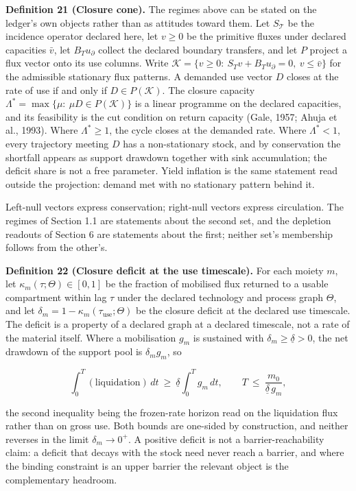 \documentclass[11pt]{article}
\begin{document}
\textbf{Definition 21 (Closure cone).} The regimes above can be stated on the ledger's own objects rather than as attitudes toward them. Let \(S_{\mathcal{T}}\) be the incidence operator declared here, let \(v\ge0\) be the primitive fluxes under declared capacities \(\bar v\), let \(B_Tu_\partial\) collect the declared boundary transfers, and let \(P\) project a flux vector onto its use columns. Write \(\mathcal K=\allowbreak{}\{v\ge0:\ S_Tv+\allowbreak{}B_Tu_\partial=\allowbreak{}0,\allowbreak{}\ v\le\bar v\}\) for the admissible stationary flux patterns. A demanded use vector \(D\) closes at the rate of use if and only if \(D\in P(\mathcal K)\). The closure capacity \(\Lambda^{*}=\allowbreak{}\max\{\mu:\ \mu D\in P(\mathcal K)\}\) is a linear programme on the declared capacities, and its feasibility is the cut condition on return capacity (Gale, 1957; Ahuja et al., 1993). Where \(\Lambda^{*}\ge1\), the cycle closes at the demanded rate. Where \(\Lambda^{*}<1\), every trajectory meeting \(D\) has a non-stationary stock, and by conservation the shortfall appears as support drawdown together with sink accumulation; the deficit share is not a free parameter. Yield inflation is the same statement read outside the projection: demand met with no stationary pattern behind it.

Left-null vectors express conservation; right-null vectors express circulation. The regimes of Section 1.1 are statements about the second set, and the depletion readouts of Section 6 are statements about the first; neither set's membership follows from the other's.

\textbf{Definition 22 (Closure deficit at the use timescale).} For each moiety \(m\), let \(\kappa_m(\tau;\Theta)\in[0,1]\) be the fraction of mobilised flux returned to a usable compartment within lag \(\tau\) under the declared technology and process graph \(\Theta\), and let \(\delta_m=\allowbreak{}1-\kappa_m(\tau_{\mathrm{use}};\Theta)\) be the closure deficit at the declared use timescale. The deficit is a property of a declared graph at a declared timescale, not a rate of the material itself. Where a mobilisation \(g_m\) is sustained with \(\delta_m\ge\underline\delta>0\), the net drawdown of the support pool is \(\delta_mg_m\), so 

$$\int_0^T(\text{liquidation})\,dt\ \ge\ \underline\delta\int_0^Tg_m\,dt, \qquad T\ \le\ \frac{m_0}{\underline\delta\,g_m},$$

 the second inequality being the frozen-rate horizon read on the liquidation flux rather than on gross use. Both bounds are one-sided by construction, and neither reverses in the limit \(\delta_m\to0^+\). A positive deficit is not a barrier-reachability claim: a deficit that decays with the stock need never reach a barrier, and where the binding constraint is an upper barrier the relevant object is the complementary headroom.
\end{document}
